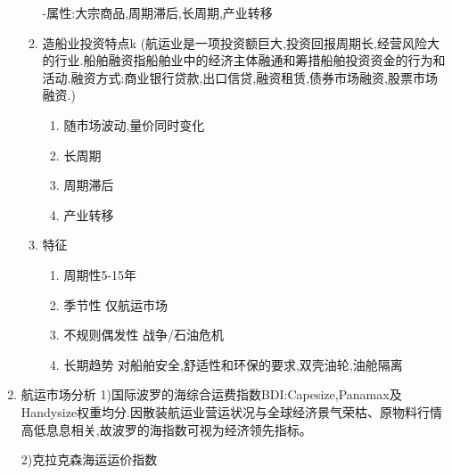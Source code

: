 \documentclass[UTF8,a4paper]{ctexart}
\begin{document}
\begin{enumerate}[1)]
\begin{enumerate}[.]
				-属性:大宗商品,周期滞后,长周期,产业转移
			\item 造船业投资特点k
				(航运业是一项投资额巨大,投资回报周期长,经营风险大的行业.船舶融资指船舶业中的经济主体融通和筹措船舶投资资金的行为和活动.融资方式:商业银行贷款,出口信贷,融资租赁,债券市场融资,股票市场融资.)
				\begin{enumerate}
					\item 随市场波动,量价同时变化
					\item 长周期
					\item 周期滞后
					\item 产业转移
				\end{enumerate}
			\item 特征
				\begin{enumerate}
					\item 周期性5-15年
					\item 季节性 仅航运市场
					\item 不规则偶发性 战争/石油危机
					\item 长期趋势 对船舶安全,舒适性和环保的要求,双壳油轮,油舱隔离
				\end{enumerate}
		\end{enumerate}
	
	\item 航运市场分析
		1)国际波罗的海综合运费指数BDI:Capesize,Panamax及Handysize权重均分.因散装航运业营运状况与全球经济景气荣枯、原物料行情高低息息相关,故波罗的海指数可视为经济领先指标。
		
		2)克拉克森海运运价指数
	\end{enumerate}
	
\end{document}
